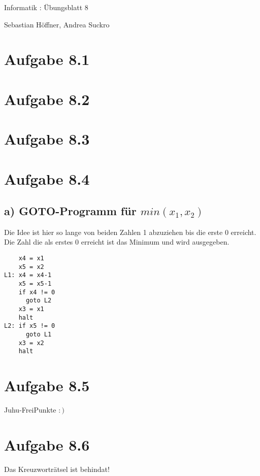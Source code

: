 \documentclass{article}
\begin{document}
\begin{center}
  \Large{Informatik \revD: Übungsblatt 8}

  \large{Sebastian Höffner, Andrea Suckro}
\end{center}



\section*{Aufgabe 8.1}
\section*{Aufgabe 8.2}
\section*{Aufgabe 8.3}
\section*{Aufgabe 8.4}
\subsection*{a) GOTO-Programm für $min(x_1,x_2)$}
Die Idee ist hier so lange von beiden Zahlen 1 abzuziehen bis die erste 0 erreicht. Die Zahl die als erstes 0 erreicht ist das Minimum und wird ausgegeben.
\begin{verbatim}
    x4 = x1
    x5 = x2
L1: x4 = x4-1
    x5 = x5-1
    if x4 != 0
      goto L2
    x3 = x1
    halt
L2: if x5 != 0
      goto L1
    x3 = x2
    halt
\end{verbatim}
\section*{Aufgabe 8.5}
Juhu-FreiPunkte $:)$
\section*{Aufgabe 8.6}
Das Kreuzworträtsel ist behindat!
\end{document}
